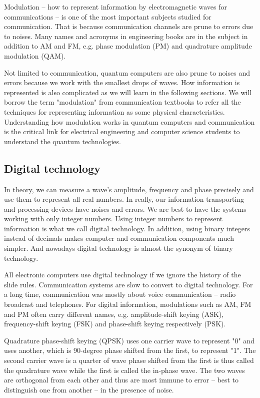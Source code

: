 \documentclass{book}
\begin{document}
Modulation -- how to represent information by electromagnetic waves for communications -- is one of the most important subjects studied for communication. That is because communication channels are prune to errors due to noises. Many names and acronyms in engineering books are in the subject in addition to AM and FM, e.g. phase modulation (PM) and quadrature amplitude modulation (QAM).

Not limited to communication, quantum computers are also prune to noises and errors because we work with the smallest drops of waves. How information is represented is also complicated as we will learn in the following sections. We will borrow the term "modulation" from communication textbooks to refer all the techniques for representing information as some physical characteristics. Understanding how modulation works in quantum computers and communication is the critical link for electrical engineering and computer science students to understand the quantum technologies. 

\subsection{Digital technology}
In theory, we can measure a wave's amplitude, frequency and phase precisely and use them to represent all real numbers. In really, our information transporting and processing devices have noises and errors. We are best to have the systems working with only integer numbers. Using integer numbers to represent information is what we call digital technology. In addition, using binary integers instead of decimals makes computer and communication components much simpler. And nowadays digital technology is almost the synonym of binary technology.

All electronic computers use digital technology if we ignore the history of the slide rules. Communication systems are slow to convert to digital technology. For a long time, communication was mostly about voice communication -- radio broadcast and telephones. For digital information, modulations such as AM, FM and PM often carry different names, e.g. amplitude-shift keying (ASK), frequency-shift keying (FSK) and phase-shift keying respectively (PSK).

Quadrature phase-shift keying (QPSK) uses one carrier wave to represent "0" and uses another, which is 90-degree phase shifted from the first, to represent "1". The second carrier wave is a quarter of wave phase shifted from the first is thus called the quadrature wave while the first is called the in-phase wave. The two waves are orthogonal from each other and thus are most immune to error -- best to distinguish one from another -- in the presence of noise.
\end{document}
